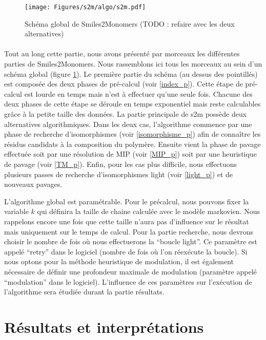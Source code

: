 \documentclass[12pt,french,twoside]{report}
\begin{document}
\begin{figure}
  \begin{center}
    \texttt{[image: Figures/s2m/algo/s2m.pdf]}
    \caption{\label{global_s2m}Schéma global de Smiles2Monomers (TODO : refaire avec les deux alternatives)}
  \end{center}
\end{figure}

\paragraph{}Tout au long cette partie, nous avons présenté par morceaux les différentes parties de Smiles2Monomers.
Nous rassemblons ici tous les morceaux au sein d'un schéma global (figure \ref{global_s2m}).
Le première partie du schéma (au dessus des pointillés) est composée des deux phases de pré-calcul (voir \ref{index_p}).
Cette étape de pré-calcul est lourde en temps mais n'est à effectuer qu'une seule fois.
Chacune des deux phases de cette étape se déroule en temps exponentiel mais reste calculables grâce à la petite taille des
données.
La partie principale de s2m possède deux alternatives algorithmiques.
Dans les deux cas, l'algorithme commence par une phase de recherche d'isomorphismes (voir \ref{isomorphisme_p}) afin de connaître les résidus candidats à la composition du polymère.
Ensuite vient la phase de pavage effectuée soit par une résolution de MIP (voir \ref{MIP_p}) soit par une heuristique de pavage (voir \ref{TM_p}).
Enfin, pour les cas plus difficile, nous effectuons plusieurs passes de recherche d'isomorphismes light (voir \ref{light_p}) et de nouveaux pavages.

L'algorithme global est paramétrable.
Pour le précalcul, nous pouvons fixer la variable $k$ qui définira la taille de chaine calculée avec le modèle markovien.
Nous rappelons encore une fois que cette taille n'aura pas d'influence sur le résultat mais uniquement sur le temps de calcul.
Pour la partie recherche, nous devrons choisir le nombre de fois où nous effectuerons la ``boucle light''.
Ce paramètre est appelé ``retry'' dans le logiciel (nombre de fois où l'on réexécute la boucle).
Si nous optons pour la méthode heuristique de modulation, il est également nécessaire de définir une profondeur maximale de modulation (paramètre appelé ``modulation'' dans le logiciel).
L'influence de ces paramètres sur l'exécution de l'algorithme sera étudiée durant la partie résultats.




\section{Résultats et interprétations}
\end{document}
